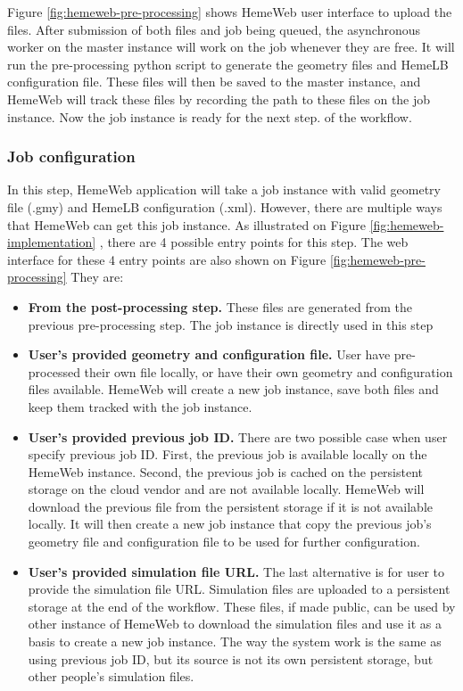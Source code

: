 \vspace{1cm}


Figure \ref{fig:hemeweb-pre-processing} shows HemeWeb user interface to upload the files.  After submission of both files and job being queued, the asynchronous worker on the master instance will work on the job whenever they are free. It will run the pre-processing python script to generate the geometry files and HemeLB configuration file. These files will then be saved to the master instance, and HemeWeb will track these files by recording the path to these files on the job instance. Now the job instance is ready for the next step. of the workflow.

\subsubsection{Job configuration}

In this step, HemeWeb application will take a job instance with valid geometry file (.gmy) and HemeLB configuration (.xml). However, there are multiple ways that HemeWeb can get this job instance. As illustrated on Figure \ref{fig:hemeweb-implementation} , there are 4 possible entry points for this step. The web interface for these 4 entry points are also shown on Figure \ref{fig:hemeweb-pre-processing} They are:

\begin{itemize}
    \item \textbf{From the post-processing step.}
    	These files are generated from the previous pre-processing step. The job instance is directly used in this step
    
    \item \textbf{User's provided geometry and configuration file.}
    	User have pre-processed their own file locally, or have their own geometry and configuration files available. HemeWeb will create a new job instance, save both files and keep them tracked with the job instance.
	
    \item \textbf{User's provided previous job ID.}
    	There are two possible case when user specify previous job ID. First, the previous job is available locally on the HemeWeb instance. Second, the previous job is cached on the persistent storage on the cloud vendor and are not available locally. HemeWeb will download the previous file from the persistent storage if it is not available locally. It will then create a new job instance that copy the previous job's geometry file and configuration file to be used for further configuration.
    
    \item \textbf{User's provided simulation file URL.}
    	The last alternative is for user to provide the simulation file URL. Simulation files are uploaded to a persistent storage at the end of the workflow. These files, if made public, can be used by other instance of HemeWeb to download the simulation files and use it as a basis to create a new job instance. The way the system work is the same as using previous job ID, but its source is not its own persistent storage, but other people's simulation files.

\end{itemize}


